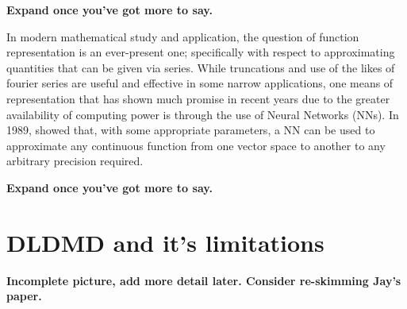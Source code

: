 \textbf{Expand once you've got more to say.}

In modern mathematical study and application, the question of function representation is
an ever-present one; specifically with respect to approximating quantities that can be 
given via series. While truncations and use of the likes of fourier series are useful and 
effective in some narrow applications, one means of representation that has shown much 
promise in recent years due to the greater availability of computing power is through 
the use of Neural Networks (NNs). In 1989, \cite{hornik} showed that, with some appropriate
parameters, a NN can be used to approximate any continuous function from one vector space 
to another to any arbitrary precision required. 

\textbf{Expand once you've got more to say.}

\section{DLDMD and it's limitations}

\textbf{Incomplete picture, add more detail later. Consider re-skimming Jay's paper.}

